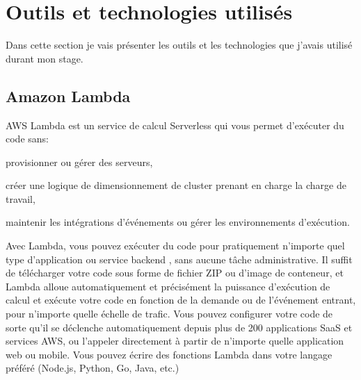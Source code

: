 
\chapter{Outils et technologies utilisés} %

\label{Chaptre3} %

Dans cette section je vais présenter les outils et les technologies que j’avais utilisé durant mon stage.



\section{Amazon Lambda}
AWS Lambda est un service de calcul Serverless qui vous permet d’exécuter du code sans:
\begin{list}{•}
	\item provisionner ou gérer des serveurs,
	\item créer une logique de dimensionnement de cluster prenant en charge la charge de travail,
	\item  maintenir les intégrations d’événements ou gérer les environnements d’exécution.
\end{list}
Avec Lambda, vous pouvez exécuter du code pour pratiquement n’importe quel type d’application ou service backend , sans aucune tâche administrative. Il suffit de télécharger votre code sous forme de fichier
ZIP ou d’image de conteneur, et Lambda alloue automatiquement et précisément la puissance d’exécution
de calcul et exécute votre code en fonction de la demande ou de l’événement entrant, pour n’importe quelle
échelle de trafic.
Vous pouvez configurer votre code de sorte qu’il se déclenche automatiquement depuis plus de 200 applications SaaS et services AWS, ou l’appeler directement à partir de n’importe quelle application web ou
mobile.
Vous pouvez écrire des fonctions Lambda dans votre langage préféré (Node.js, Python, Go, Java, etc.)
